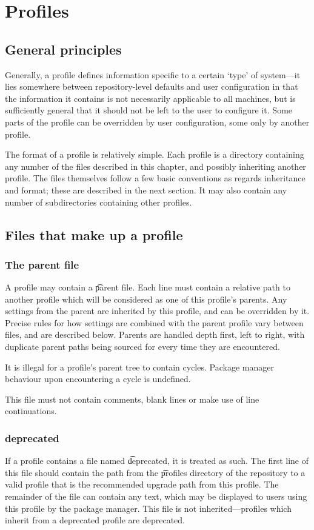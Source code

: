 \chapter{Profiles}
\label{profiles}

\section{General principles}
Generally, a profile defines information specific to a certain `type' of system---it lies somewhere
between repository-level defaults and user configuration in that the information it contains is not
necessarily applicable to all machines, but is sufficiently general that it should not be left to
the user to configure it. Some parts of the profile can be overridden by user configuration, some
only by another profile.

The format of a profile is relatively simple. Each profile is a directory containing any number of
the files described in this chapter, and possibly inheriting another profile. The files themselves
follow a few basic conventions as regards inheritance and format; these are described in the next
section. It may also contain any number of subdirectories containing other profiles.

\section{Files that make up a profile}
\subsection{The parent file}
A profile may contain a \t{parent} file. Each line must contain a relative path to another profile
which will be considered as one of this profile's parents. Any settings from the parent are
inherited by this profile, and can be overridden by it. Precise rules for how settings are combined
with the parent profile vary between files, and are described below. Parents are handled depth
first, left to right, with duplicate parent paths being sourced for every time they are encountered.

It is illegal for a profile's parent tree to contain cycles. Package manager behaviour upon
encountering a cycle is undefined.

This file must not contain comments, blank lines or make use of line continuations.

\subsection{deprecated}
If a profile contains a file named \t{deprecated}, it is treated as such. The first line of this
file should contain the path from the \t{profiles} directory of the repository to a valid profile
that is the recommended upgrade path from this profile. The remainder of the file can contain any
text, which may be displayed to users using this profile by the package manager. This file is not
inherited---profiles which inherit from a deprecated profile are  deprecated.


